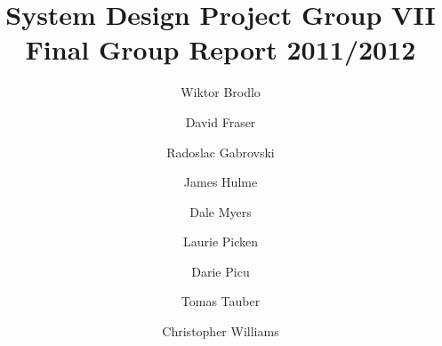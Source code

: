 \documentclass[12pt,a4paper]{article}
\begin{document}
\title{System Design Project Group VII Final Group Report 2011/2012}
\author{Wiktor Brodlo \and David Fraser \and Radoslac Gabrovski \and James
Hulme \and Dale Myers \and Laurie Picken \and Darie Picu \and Tomas Tauber \and
Christopher Williams}

\maketitle

\twocolumn











\onecolumn
\appendix



\newpage


\end{document}
